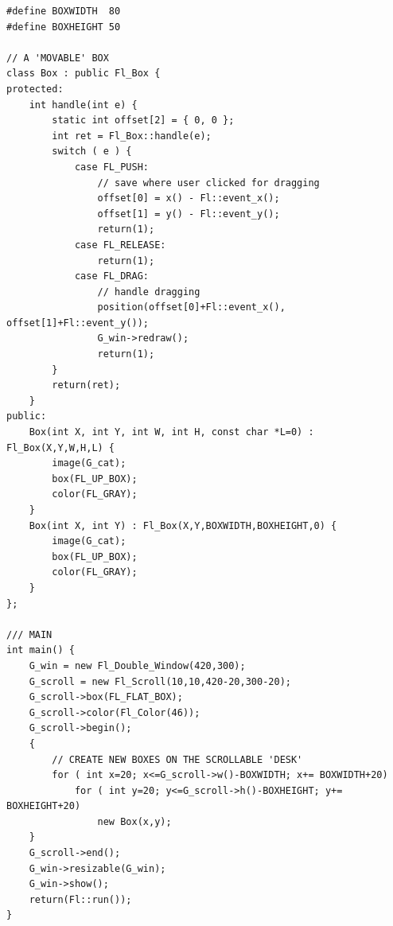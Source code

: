 \documentclass[10pt, oneside]{article}   	%
\begin{document}
\begin{lstlisting}
#define BOXWIDTH  80
#define BOXHEIGHT 50

// A 'MOVABLE' BOX
class Box : public Fl_Box {
protected:
    int handle(int e) {
        static int offset[2] = { 0, 0 };
        int ret = Fl_Box::handle(e);
        switch ( e ) {
            case FL_PUSH:
                // save where user clicked for dragging
                offset[0] = x() - Fl::event_x();                    
                offset[1] = y() - Fl::event_y();
                return(1);
            case FL_RELEASE:
                return(1);
            case FL_DRAG:
                // handle dragging
                position(offset[0]+Fl::event_x(), offset[1]+Fl::event_y());
                G_win->redraw();
                return(1);
        }
        return(ret);
    }
public:
    Box(int X, int Y, int W, int H, const char *L=0) : Fl_Box(X,Y,W,H,L) {
        image(G_cat);
        box(FL_UP_BOX);
        color(FL_GRAY);
    }
    Box(int X, int Y) : Fl_Box(X,Y,BOXWIDTH,BOXHEIGHT,0) {
        image(G_cat);
        box(FL_UP_BOX);
        color(FL_GRAY);
    }
};

/// MAIN
int main() {
    G_win = new Fl_Double_Window(420,300);
    G_scroll = new Fl_Scroll(10,10,420-20,300-20);
    G_scroll->box(FL_FLAT_BOX);
    G_scroll->color(Fl_Color(46));
    G_scroll->begin();
    {
        // CREATE NEW BOXES ON THE SCROLLABLE 'DESK'
        for ( int x=20; x<=G_scroll->w()-BOXWIDTH; x+= BOXWIDTH+20)
            for ( int y=20; y<=G_scroll->h()-BOXHEIGHT; y+= BOXHEIGHT+20)
                new Box(x,y);
    }
    G_scroll->end();
    G_win->resizable(G_win);
    G_win->show();
    return(Fl::run());
}
\end{lstlisting}

\newpage
\end{document}
